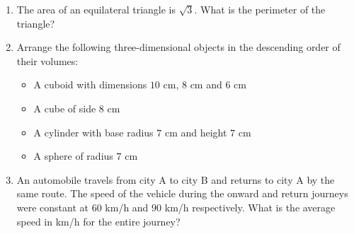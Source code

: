 \documentclass[journal]{IEEEtran}
\begin{document}
\begin{enumerate}
    \item The area of an equilateral triangle is $\sqrt{3}$. What is the perimeter of the triangle?
    
    \hfill{}
    \begin{enumerate}
    \end{enumerate}

    \item Arrange the following three-dimensional objects in the descending order of their volumes:
    \begin{itemize}
        \item {} A cuboid with dimensions $10$ cm, $8$ cm and $6$ cm
        \item {} A cube of side $8$ cm
        \item {} A cylinder with base radius $7$ cm and height $7$ cm
        \item {} A sphere of radius $7$ cm
    \end{itemize}
    
    \hfill{}
    \begin{enumerate}
    \end{enumerate}

    \item An automobile travels from city A to city B and returns to city A by the same route. The speed of the vehicle during the onward and return journeys were constant at $60$ km/h and $90$ km/h respectively. What is the average speed in km/h for the entire journey?
    
    \hfill{}
    \begin{enumerate}
    \end{enumerate}


\end{enumerate}
\end{document}
